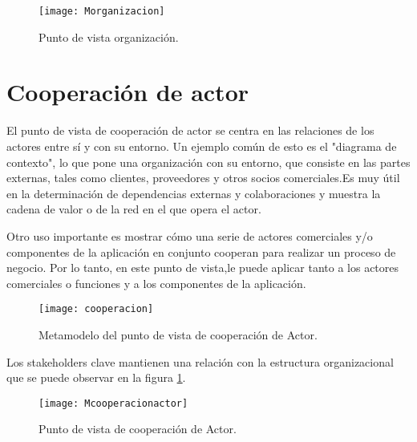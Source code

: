 \begin{figure}[h]
\centering
\texttt{[image: Morganizacion]}
\caption{Punto de vista organización.}
\end{figure}
 
\section{Cooperación de actor}



El punto de vista de cooperación de actor se centra en las relaciones de los actores entre sí y con su entorno. Un ejemplo común de esto es el "diagrama de contexto", lo que pone una organización con su entorno, que consiste en las partes externas, tales como clientes, proveedores y otros socios comerciales.Es muy útil en la determinación de dependencias externas y colaboraciones y muestra la cadena de valor o de la red en el que opera el actor. 

Otro uso importante es mostrar cómo una serie de actores comerciales y/o componentes de la aplicación en conjunto cooperan para realizar un proceso de negocio. Por lo tanto, en este punto de vista,le puede aplicar tanto a los actores comerciales o funciones y a los componentes de la aplicación.

\begin{figure}[h]
\texttt{[image: cooperacion]}
\centering
\caption{Metamodelo del punto de vista de cooperación de Actor.}
\end{figure}

Los stakeholders clave mantienen una relación con la estructura organizacional que se puede observar en la figura \ref{mcooperacionactor}.

\begin{figure}[h] 
\texttt{[image: Mcooperacionactor]}
\centering
\caption{Punto de vista de cooperación de Actor.}
\label{mcooperacionactor}
\end{figure}


